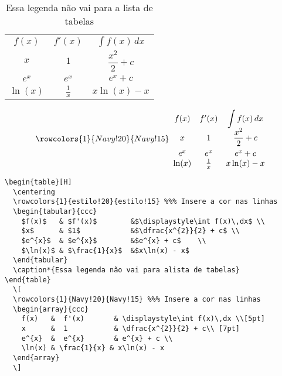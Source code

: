\begin{table}[H]
  \centering
  \begin{tabular}{ccc}
    $f(x)$   & $f'(x)$        &$\displaystyle\int f(x)\,dx$ \\ 
    $x$      & $1$            &$\dfrac{x^{2}}{2} + c$ \\
    $e^{x}$  & $e^{x}$        &$e^{x} + c$    \\
    $\ln(x)$ & $\frac{1}{x}$  &$x\ln(x) - x$   
  \end{tabular}
  \caption*{Essa legenda não vai para a lista de tabelas}
\end{table}
  \[
  \rowcolors{1}{Navy!20}{Navy!15} %
  \begin{array}{ccc}
    f(x)   &  f'(x)       & \displaystyle\int f(x)\,dx \\[5pt] 
    x      &  1           & \dfrac{x^{2}}{2} + c\\ [7pt] 
    e^{x}  &  e^{x}       & e^{x} + c \\ 
    \ln(x) & \frac{1}{x} & x\ln(x) - x 
  \end{array}
  \]
\begin{lstlisting}
\begin{table}[H]
  \centering
  \rowcolors{1}{estilo!20}{estilo!15} %%% Insere a cor nas linhas
  \begin{tabular}{ccc}
    $f(x)$   & $f'(x)$        &$\displaystyle\int f(x)\,dx$ \\ 
    $x$      & $1$            &$\dfrac{x^{2}}{2} + c$ \\
    $e^{x}$  & $e^{x}$        &$e^{x} + c$    \\
    $\ln(x)$ & $\frac{1}{x}$  &$x\ln(x) - x$   
  \end{tabular}
  \caption*{Essa legenda não vai para alista de tabelas}
\end{table}
  \[
  \rowcolors{1}{Navy!20}{Navy!15} %%% Insere a cor nas linhas
  \begin{array}{ccc}
    f(x)   &  f'(x)       & \displaystyle\int f(x)\,dx \\[5pt] 
    x      &  1           & \dfrac{x^{2}}{2} + c\\ [7pt] 
    e^{x}  &  e^{x}       & e^{x} + c \\ 
    \ln(x) & \frac{1}{x} & x\ln(x) - x 
  \end{array}
  \]
\end{lstlisting}




